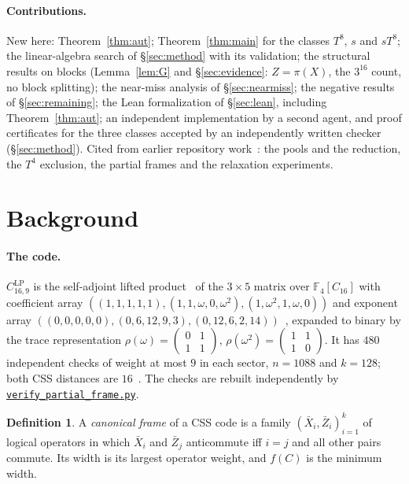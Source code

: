 \documentclass[11pt]{article}
\theoremstyle{definition}
\newtheorem{definition}[theorem]{Definition}
\theoremstyle{remark}
\newcommand{\F}{\mathbb{F}}
\newcommand{\CLP}{C^{\mathrm{LP}}_{16,9}}
\newcommand{\repourl}{https://github.com/alectionary/vibe-math}
\newcommand{\cdir}{formalization/canonical-width/c16}
\newcommand{\prior}[2]{\href{\repourl/blob/master/\cdir/#1}{#2}}
\begin{document}
\paragraph{Contributions.} New here: Theorem~\ref{thm:aut}; Theorem~\ref{thm:main} for the classes $T^8$, $s$ and $sT^8$; the linear-algebra search of \S\ref{sec:method} with its validation; the structural results on blocks (Lemma~\ref{lem:G} and \S\ref{sec:evidence}: $Z=\pi(X)$, the $3^{16}$ count, no block splitting); the near-miss analysis of \S\ref{sec:nearmiss}; the negative results of \S\ref{sec:remaining}; the Lean formalization of \S\ref{sec:lean}, including Theorem~\ref{thm:aut}; an independent implementation by a second agent, and proof certificates for the three classes accepted by an independently written checker (\S\ref{sec:method}). Cited from earlier repository work~\cite{investigation,enumeration,structural}: the pools and the reduction, the $T^4$ exclusion, the partial frames and the relaxation experiments.

\section{Background}\label{sec:background}

\paragraph{The code.} $\CLP$ is the self-adjoint lifted product~\cite{pk} of the $3\times5$ matrix over $\F_4[C_{16}]$ with coefficient array $((1,1,1,1,1),\allowbreak(1,1,\omega,0,\omega^2),\allowbreak(1,\omega^2,1,\omega,0))$ and exponent array $((0,0,0,0,0),\allowbreak(0,6,12,9,3),\allowbreak(0,12,6,2,14))$~\cite[eq.~(50)]{lee}, expanded to binary by the trace representation $\rho(\omega)=\left(\begin{smallmatrix}0&1\\1&1\end{smallmatrix}\right)$, $\rho(\omega^2)=\left(\begin{smallmatrix}1&1\\1&0\end{smallmatrix}\right)$. It has $480$ independent checks of weight at most $9$ in each sector, $n=1088$ and $k=128$; both CSS distances are $16$~\cite{enumeration}. The checks are rebuilt independently by \prior{verify_partial_frame.py}{\texttt{verify\_partial\_frame.py}}.

\begin{definition}
A \emph{canonical frame} of a CSS code is a family $(\bar X_i,\bar Z_i)_{i=1}^{k}$ of logical operators in which $\bar X_i$ and $\bar Z_j$ anticommute iff $i=j$ and all other pairs commute. Its width is its largest operator weight, and $f(C)$ is the minimum width.
\end{definition}
\end{document}

